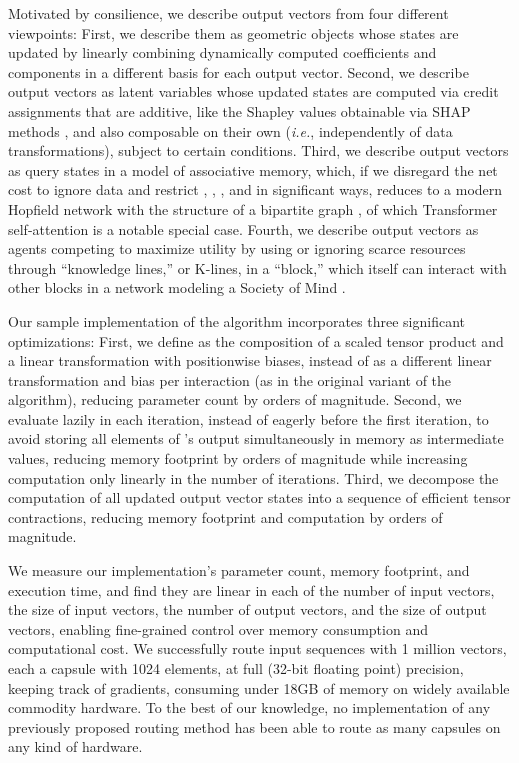 \documentclass[11pt,a4paper]{article}
\begin{document}
Motivated by consilience, we describe output vectors from four different viewpoints: First, we describe them as geometric objects whose states are updated by linearly combining dynamically computed coefficients and components in a different basis for each output vector. Second, we describe output vectors as latent variables whose updated states are computed via credit assignments that are additive, like the Shapley values obtainable via SHAP methods \cite{NIPS2017_7062}, and also composable on their own ({\em i.e.}, independently of data transformations), subject to certain conditions. Third, we describe output vectors as query states in a model of associative memory, which, if we disregard the net cost to ignore data and restrict  , , , and  in significant ways, reduces to a modern Hopfield network with the structure of a bipartite graph \cite{krotov2021large} \cite{ramsauer2021hopfield}, of which Transformer self-attention \cite{DBLP:journals/corr/VaswaniSPUJGKP17} is a notable special case. Fourth, we describe output vectors as agents competing to maximize utility by using or ignoring scarce resources through ``knowledge lines,'' or K-lines, in a ``block,'' which itself can interact with other blocks in a network modeling a Society of Mind \cite{10.5555/22939}.

Our sample implementation of the algorithm incorporates three significant optimizations: First, we define  as the composition of a scaled tensor product and a linear transformation with positionwise biases, instead of as a different linear transformation and bias per interaction (as in the original variant of the algorithm), reducing parameter count by orders of magnitude. Second, we evaluate  lazily in each iteration, instead of eagerly before the first iteration, to avoid storing all elements of 's output simultaneously in memory as intermediate values, reducing memory footprint by orders of magnitude while increasing computation only linearly in the number of iterations. Third, we decompose the computation of all updated output vector states into a sequence of efficient tensor contractions, reducing memory footprint and computation by orders of magnitude.

We measure our implementation's parameter count, memory footprint, and execution time, and find they are linear in each of the number of input vectors, the size of input vectors, the number of output vectors, and the size of output vectors, enabling fine-grained control over memory consumption and computational cost. We successfully route input sequences with 1 million vectors, each a capsule with 1024 elements, at full (32-bit floating point) precision, keeping track of gradients, consuming under 18GB of memory on widely available commodity hardware. To the best of our knowledge, no implementation of any previously proposed routing method has been able to route as many capsules on any kind of hardware.
\end{document}
